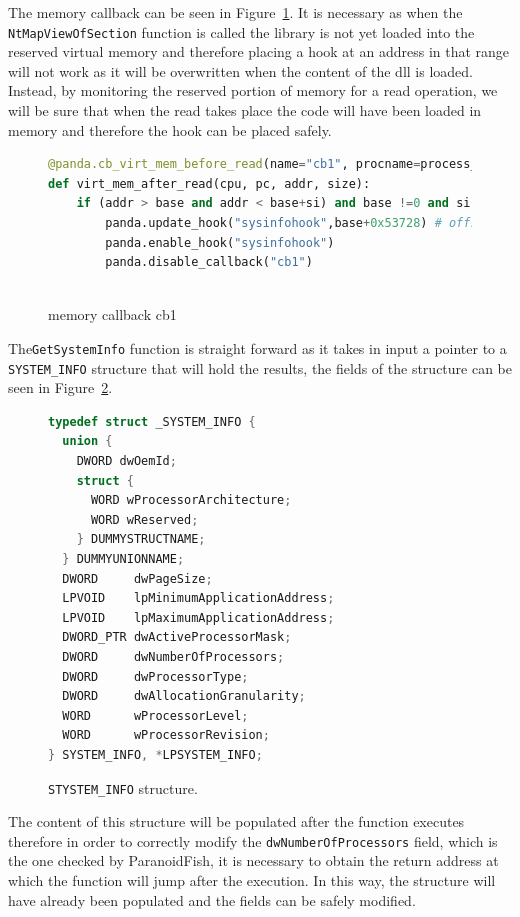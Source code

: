 The memory callback can be seen in Figure~\ref{fig:cb1}. It is necessary as when the \lstinline{NtMapViewOfSection} function is called the library is not yet loaded into the reserved virtual memory and therefore placing a hook at an address in that range will not work as it will be overwritten when the content of the dll is loaded. Instead, by monitoring the reserved portion of memory for a read operation, we will be sure that when the read takes place the code will have been loaded in memory and therefore the hook can be placed safely. 

\begin{figure}[htp]
\centering
\begin{lstlisting}[language=Python] 
@panda.cb_virt_mem_before_read(name="cb1", procname=process_name, enabled=False)
def virt_mem_after_read(cpu, pc, addr, size):
    if (addr > base and addr < base+si) and base !=0 and si !=0:
        panda.update_hook("sysinfohook",base+0x53728) # offset of GetSystemInfo
        panda.enable_hook("sysinfohook")
        panda.disable_callback("cb1")
        
\end{lstlisting}
\caption{memory callback cb1}
\label{fig:cb1}
\end{figure}

The\lstinline{GetSystemInfo} function is straight forward as it takes in input a pointer to a \lstinline{SYSTEM_INFO} structure that will hold the results, the fields of the structure can be seen in Figure~\ref{fig:sysinfo}.

\begin{figure}[htp]
\centering
\begin{lstlisting}[language=C++] 
typedef struct _SYSTEM_INFO {
  union {
    DWORD dwOemId;
    struct {
      WORD wProcessorArchitecture;
      WORD wReserved;
    } DUMMYSTRUCTNAME;
  } DUMMYUNIONNAME;
  DWORD     dwPageSize;
  LPVOID    lpMinimumApplicationAddress;
  LPVOID    lpMaximumApplicationAddress;
  DWORD_PTR dwActiveProcessorMask;
  DWORD     dwNumberOfProcessors;
  DWORD     dwProcessorType;
  DWORD     dwAllocationGranularity;
  WORD      wProcessorLevel;
  WORD      wProcessorRevision;
} SYSTEM_INFO, *LPSYSTEM_INFO;
\end{lstlisting}
\caption{\lstinline{STYSTEM_INFO} structure.}
\label{fig:sysinfo}
\end{figure}

The content of this structure will be populated after the function executes therefore in order to correctly modify the \lstinline{dwNumberOfProcessors} field, which is the one checked by ParanoidFish, it is necessary to obtain the return address at which the function will jump after the execution. In this way, the structure will have already been populated and the fields can be safely modified.

